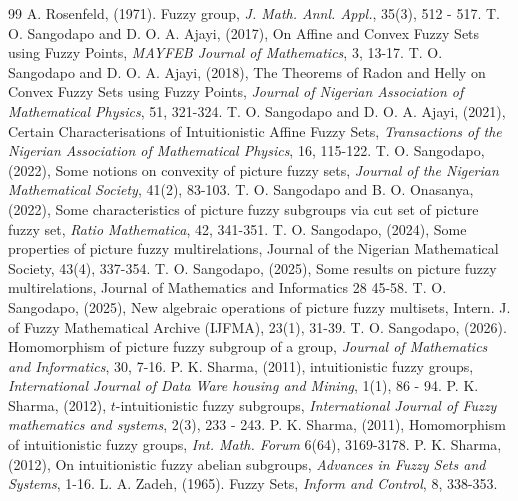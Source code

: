 \documentclass[12pt,letterpaper]{amsart}
\theoremstyle{plain}
\theoremstyle{definition}
\numberwithin{equation}{section}
\begin{document}
\begin{thebibliography}{99}
 A. Rosenfeld, (1971). Fuzzy group, \emph{J. Math. Annl. Appl.}, 35(3), 512 - 517.
 T. O. Sangodapo and D. O. A. Ajayi, (2017), On Affine and Convex Fuzzy Sets using Fuzzy Points, \emph{MAYFEB Journal of Mathematics}, 3, 13-17.
 T. O. Sangodapo and D. O. A. Ajayi, (2018), The Theorems of Radon and Helly on Convex Fuzzy Sets using Fuzzy Points, \emph{Journal of Nigerian Association of Mathematical Physics}, 51, 321-324.
 T. O. Sangodapo and D. O. A. Ajayi, (2021), Certain Characterisations of Intuitionistic Affine Fuzzy Sets, \emph{Transactions of the Nigerian Association of Mathematical Physics}, 16, 115-122.
 T. O. Sangodapo, (2022), Some notions on convexity of picture fuzzy sets, \emph{Journal of the Nigerian Mathematical Society}, 41(2), 83-103.
 T. O. Sangodapo and B. O. Onasanya, (2022), Some characteristics of picture fuzzy subgroups via cut set of picture fuzzy set, \emph{Ratio Mathematica}, 42, 341-351.
 T. O. Sangodapo, (2024), Some properties of picture fuzzy multirelations, Journal of the Nigerian Mathematical Society, 43(4), 337-354.
 T. O. Sangodapo, (2025), Some results on picture fuzzy multirelations, Journal of Mathematics and Informatics 28 45-58.
 T. O. Sangodapo, (2025), New algebraic operations of picture fuzzy multisets, Intern. J. of Fuzzy Mathematical Archive (IJFMA), 23(1), 31-39.
 T. O. Sangodapo, (2026). Homomorphism of picture fuzzy subgroup of a group, \emph{Journal of Mathematics and Informatics}, 30, 7-16.
 P. K. Sharma, (2011), intuitionistic fuzzy groups, \emph{International Journal of Data Ware housing and Mining}, 1(1), 86 - 94.
 P. K. Sharma, (2012), $t$-intuitionistic fuzzy subgroups, \emph{International Journal of Fuzzy mathematics and systems}, 2(3), 233 - 243.
 P. K. Sharma, (2011), Homomorphism of intuitionistic fuzzy groups, \emph{Int. Math. Forum} 6(64), 3169-3178.
 P. K. Sharma, (2012), On intuitionistic fuzzy abelian subgroups, \emph{Advances in Fuzzy Sets and Systems}, 1-16.
 L. A. Zadeh, (1965). Fuzzy Sets, \emph {Inform and Control}, 8, 338-353.
\end{thebibliography}
\end{document}
